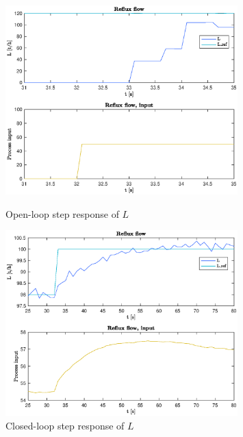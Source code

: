 \documentclass[12pt]{article}
\begin{document}
\begin{figure}
\centering
\includegraphics[width=0.8\textwidth]{../Systemanalyse/Log_Data_to_Matlab/Figurer/Stegeksperimenter/FC1015.eps}
\caption{Open-loop step response of $L$}
\label{fig:ol_step_FC1015}

\includegraphics[width=0.8\textwidth]{../Systemanalyse/Log_Data_to_Matlab/Figurer/Stegeksperimenter/FC1015_step.eps}
\caption{Closed-loop step response of $L$}
\label{fig:cl_step_FC1015}
\end{figure}
\end{document}
